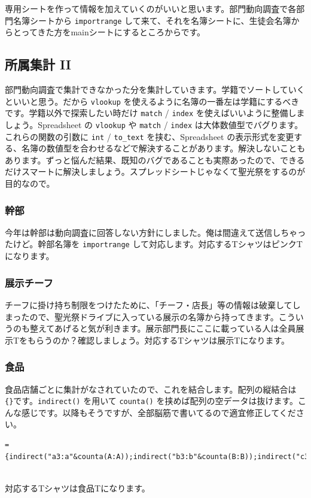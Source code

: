 \documentclass[dvipdfmx,jb5]{jreport}
\begin{document}
専用シートを作って情報を加えていくのがいいと思います。部門動向調査で各部門名簿シートから \texttt{importrange} して来て、それを名簿シートに、生徒会名簿からとってきた方をmainシートにするところからです。

\subsection{所属集計 II}
部門動向調査で集計できなかった分を集計していきます。学籍でソートしていくといいと思う。だから \texttt{vlookup} を使えるように名簿の一番左は学籍にするべきです。学籍以外で探索したい時だけ \texttt{match} / \texttt{index} を使えばいいように整備しましょう。Spreadsheet の \texttt{vlookup} や \texttt{match} / \texttt{index} は大体数値型でバグります。これらの関数の引数に \texttt{int} / \texttt{to\_text} を挟む、Spreadsheet の表示形式を変更する、名簿の数値型を合わせるなどで解決することがあります。解決しないこともあります。ずっと悩んだ結果、既知のバグであることも実際あったので、できるだけスマートに解決しましょう。スプレッドシートじゃなくて聖光祭をするのが目的なので。

\subsubsection{幹部}
今年は幹部は動向調査に回答しない方針にしました。俺は間違えて送信しちゃったけど。幹部名簿を \texttt{importrange} して対応します。対応するTシャツはピンクTになります。

\subsubsection{展示チーフ}
チーフに掛け持ち制限をつけたために、「チーフ・店長」等の情報は破棄してしまったので、聖光祭ドライブに入っている展示の名簿から持ってきます。こういうのも整えてあげると気が利きます。展示部門長にここに載っている人は全員展示Tをもらうのか？確認しましょう。対応するTシャツは展示Tになります。

\subsubsection{食品}
食品店舗ごとに集計がなされていたので、これを結合します。配列の縦結合は \texttt{\{\}}です。\texttt{indirect()} を用いて \texttt{counta()} を挟めば配列の空データは抜けます。こんな感じです。以降もそうですが、全部脳筋で書いてるので適宜修正してください。
\\
\begin{lstlisting}
={indirect("a3:a"&counta(A:A));indirect("b3:b"&counta(B:B));indirect("c3:c"&counta(C:C));indirect("d3:d"&counta(D:D));indirect("e3:e"&counta(E:E));indirect("f3:f"&counta(F:F));indirect("g3:g"&counta(G:G))}
\end{lstlisting}
\\
対応するTシャツは食品Tになります。
\end{document}
